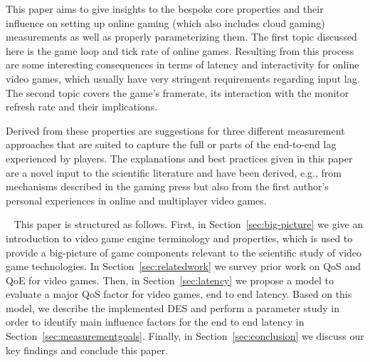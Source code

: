 
This paper aims to give insights to the bespoke core properties and their influence on setting up online gaming (which also includes cloud gaming) measurements as well as properly parameterizing them. The first topic discussed here is the game loop and tick rate of online games. Resulting from this process are some interesting consequences in terms of latency and interactivity for online video games, which usually have very stringent requirements regarding input lag. 
The second topic covers the game's framerate, its interaction with the monitor refresh rate and their implications.

Derived from these properties are suggestions for three different measurement approaches that are suited to capture the full or parts of the end-to-end lag experienced by players. The explanations and best practices given in this paper are a novel input to the scientific literature and have been derived, e.g., from mechanisms described in the gaming press but also from the first author's personal experiences in online and multiplayer video games.

~\newline
This paper is structured as follows.
First, in Section~\ref{sec:big-picture} we give an introduction to video game engine terminology and properties, which is used to provide a big-picture of game components relevant to the scientific study of video game technologies.
In Section~\ref{sec:relatedwork} we survey prior work on \gls{QoS} and \gls{QoE} for video games.
Then, in Section~\ref{sec:latency} we propose a model to evaluate a major \gls{QoS} factor for video games, end to end latency.
Based on this model, we describe the implemented \gls{DES} and perform a parameter study in order to identify main influence factors for the end to end latency in Section~\ref{sec:measurementgoals}.
Finally, in Section~\ref{sec:conclusion} we discuss our key findings and conclude this paper.


